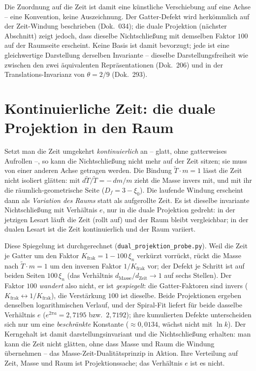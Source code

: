 Die Zuordnung auf die Zeit ist damit eine künstliche Verschiebung auf eine Achse -- eine
Konvention, keine Auszeichnung. Der Gatter-Defekt wird herkömmlich auf der Zeit-Windung
beschrieben (Dok.~034); die duale Projektion (nächster Abschnitt) zeigt jedoch, dass dieselbe
Nichtschließung mit demselben Faktor $100$ auf der Raumseite erscheint. Keine Basis ist damit
bevorzugt; jede ist eine gleichwertige Darstellung derselben Invariante -- dieselbe
Darstellungsfreiheit wie zwischen den zwei äquivalenten Repräsentationen (Dok.~206) und in der
Translations-Invarianz von $\theta=2/9$ (Dok.~293).

\section{Kontinuierliche Zeit: die duale Projektion in den Raum}
Setzt man die Zeit umgekehrt \emph{kontinuierlich} an -- glatt, ohne gatterweises Aufrollen --,
so kann die Nichtschließung nicht mehr auf der Zeit sitzen; sie muss von einer anderen Achse
getragen werden. Die Bindung $\tilde T\cdot m=1$ lässt die Zeit nicht isoliert glätten: mit
$d\tilde T/\tilde T=-\,dm/m$ zieht die Masse invers mit, und mit ihr die räumlich-geometrische
Seite ($D_f=3-\xi_0$). Die laufende Windung erscheint dann als \emph{Variation des Raums} statt
als aufgerollte Zeit. Es ist dieselbe invariante Nichtschließung mit Verhältnis $e$, nur in die
duale Projektion gedreht: in der jetzigen Lesart läuft die Zeit (rollt auf) und der Raum bleibt
vergleichbar; in der dualen Lesart ist die Zeit kontinuierlich und der Raum variiert.

Diese Spiegelung ist durchgerechnet (\texttt{dual\_projektion\_probe.py}). Weil die Zeit je
Gatter um den Faktor $K_{\text{frak}}=1-100\,\xi_n$ verkürzt vorrückt, rückt die Masse nach
$\tilde T\cdot m=1$ um den inversen Faktor $1/K_{\text{frak}}$ vor; der Defekt je Schritt ist auf
beiden Seiten $100\,\xi_n$ (das Verhältnis $d_{\text{Masse}}/d_{\text{Zeit}}\to1$ auf sechs
Stellen). Der Faktor $100$ \emph{wandert} also nicht, er ist \emph{gespiegelt}: die
Gatter-Faktoren sind invers ($K_{\text{frak}}\leftrightarrow1/K_{\text{frak}}$), die Verstärkung
$100$ ist dieselbe. Beide Projektionen ergeben denselben logarithmischen Verlauf, und der
Spiral-Fit liefert für beide dasselbe Verhältnis $e$ ($e^{2\pi a}=2{,}7195$ bzw.\ $2{,}7192$);
ihre kumulierten Defekte unterscheiden sich nur um eine \emph{beschränkte} Konstante
($\approx0{,}0134$, wächst nicht mit $\ln k$). Der Kerngehalt ist damit darstellungsinvariant und
die Nichtschließung erhalten: man kann die Zeit nicht glätten, ohne dass Masse und Raum die
Windung übernehmen -- das Masse-Zeit-Dualitätsprinzip in Aktion. Ihre Verteilung auf Zeit, Masse
und Raum ist Projektionssache; das Verhältnis $e$ ist es nicht.

